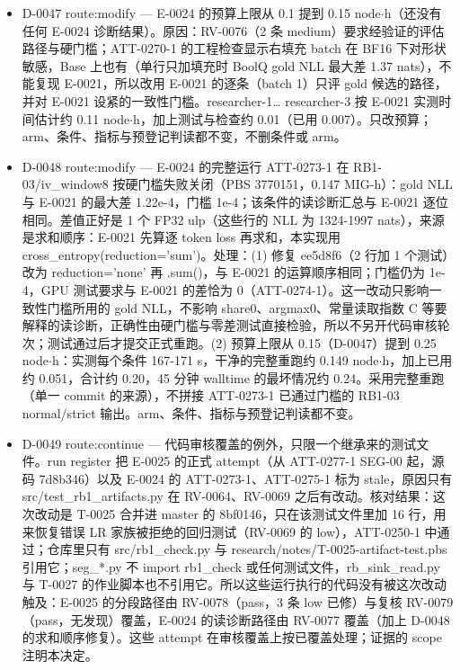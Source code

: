 \documentclass[11pt]{article}
\begin{document}
\begin{itemize}
\item D-0047 route:modify --- E-0024 的预算上限从 0.1 提到 0.15 node\ensuremath{\cdot}h（还没有任何 E-0024 诊断结果）。原因：RV-0076（2 条 medium）要求经验证的评估路径与硬门槛；ATT-0270-1 的工程检查显示右填充 batch 在 BF16 下对形状敏感，Base 上也有（单行只加填充时 BoolQ gold NLL 最大差 1.37 nats），不能复现 E-0021，所以改用 E-0021 的逐条（batch 1）只评 gold 候选的路径，并对 E-0021 设紧的一致性门槛。researcher-1\ldots{} researcher-3 按 E-0021 实测时间估计约 0.11 node\ensuremath{\cdot}h，加上测试与检查约 0.01（已用 0.007）。只改预算；arm、条件、指标与预登记判读都不变，不删条件或 arm。
\item D-0048 route:modify --- E-0024 的完整运行 ATT-0273-1 在 RB1-03/iv\_window8 按硬门槛失败关闭（PBS 3770151，0.147 MIG-h）：gold NLL 与 E-0021 的最大差 1.22e-4，门槛 1e-4；该条件的读诊断汇总与 E-0021 逐位相同。差值正好是 1 个 FP32 ulp（这些行的 NLL 为 1324-1997 nats），来源是求和顺序：E-0021 先算逐 token loss 再求和，本实现用 cross\_entropy(reduction='sum')。处理：(1) 修复 ee5d8f6（2 行加 1 个测试）改为 reduction='none' 再 .sum()，与 E-0021 的运算顺序相同；门槛仍为 1e-4，GPU 测试要求与 E-0021 的差恰为 0（ATT-0274-1）。这一改动只影响一致性门槛所用的 gold NLL，不影响 share0、argmax0、常量读取指数 C 等要解释的读诊断，正确性由硬门槛与零差测试直接检验，所以不另开代码审核轮次；测试通过后才提交正式重跑。(2) 预算上限从 0.15（D-0047）提到 0.25 node\ensuremath{\cdot}h：实测每个条件 167-171 s，干净的完整重跑约 0.149 node\ensuremath{\cdot}h，加上已用约 0.051，合计约 0.20，45 分钟 walltime 的最坏情况约 0.24。采用完整重跑（单一 commit 的来源），不拼接 ATT-0273-1 已通过门槛的 RB1-03 normal/strict 输出。arm、条件、指标与预登记判读都不变。
\item D-0049 route:continue --- 代码审核覆盖的例外，只限一个继承来的测试文件。run register 把 E-0025 的正式 attempt（从 ATT-0277-1 SEG-00 起，源码 7d8b346）以及 E-0024 的 ATT-0273-1、ATT-0275-1 标为 stale，原因只有 src/test\_rb1\_artifacts.py 在 RV-0064、RV-0069 之后有改动。核对结果：这次改动是 T-0025 合并进 master 的 8bf0146，只在该测试文件里加 16 行，用来恢复错误 LR 家族被拒绝的回归测试（RV-0069 的 low），ATT-0250-1 中通过；仓库里只有 src/rb1\_check.py 与 research/notes/T-0025-artifact-test.pbs 引用它；seg\_*.py 不 import rb1\_check 或任何测试文件，rb\_sink\_read.py 与 T-0027 的作业脚本也不引用它。所以这些运行执行的代码没有被这次改动触及：E-0025 的分段路径由 RV-0078（pass，3 条 low 已修）与复核 RV-0079（pass，无发现）覆盖，E-0024 的读诊断路径由 RV-0077 覆盖（加上 D-0048 的求和顺序修复）。这些 attempt 在审核覆盖上按已覆盖处理；证据的 scope 注明本决定。

\end{itemize}
\end{document}
